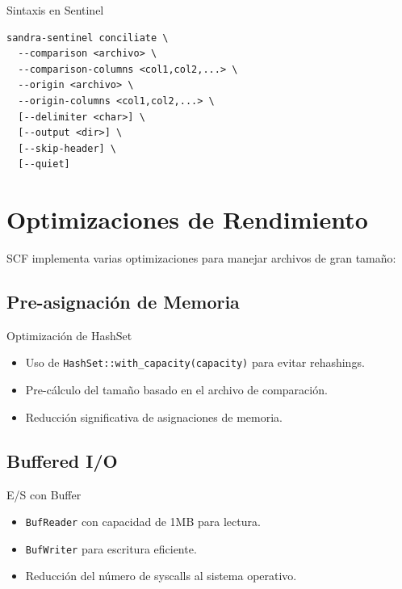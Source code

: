 \begin{caja}{Sintaxis en Sentinel}
\begin{verbatim}
sandra-sentinel conciliate \
  --comparison <archivo> \
  --comparison-columns <col1,col2,...> \
  --origin <archivo> \
  --origin-columns <col1,col2,...> \
  [--delimiter <char>] \
  [--output <dir>] \
  [--skip-header] \
  [--quiet]
\end{verbatim}
\end{caja}


\section{Optimizaciones de Rendimiento}

SCF implementa varias optimizaciones para manejar archivos de gran tamaño:

\subsection{Pre-asignación de Memoria}

\begin{caja}{Optimización de HashSet}
\begin{itemize}
\item Uso de \texttt{HashSet::with\_capacity(capacity)} para evitar rehashings.
\item Pre-cálculo del tamaño basado en el archivo de comparación.
\item Reducción significativa de asignaciones de memoria.
\end{itemize}
\end{caja}


\bigskip

\subsection{Buffered I/O}

\begin{caja}{E/S con Buffer}
\begin{itemize}
\item \texttt{BufReader} con capacidad de 1MB para lectura.
\item \texttt{BufWriter} para escritura eficiente.
\item Reducción del número de syscalls al sistema operativo.
\end{itemize}
\end{caja}

